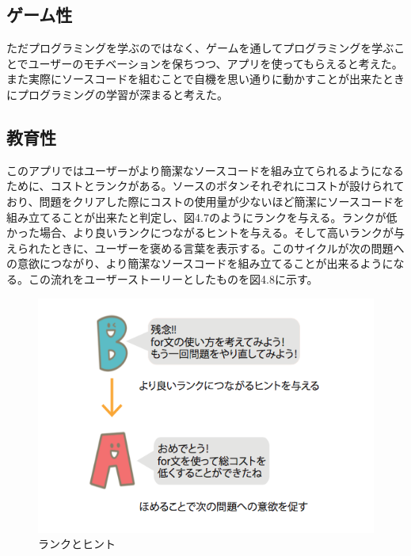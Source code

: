 \documentclass[openany,11pt,papersize]{jsbook}
\begin{document}

\subsection{ゲーム性}
ただプログラミングを学ぶのではなく、ゲームを通してプログラミングを学ぶことでユーザーのモチベーションを保ちつつ、アプリを使ってもらえると考えた。また実際にソースコードを組むことで自機を思い通りに動かすことが出来たときにプログラミングの学習が深まると考えた。
 


\subsection{教育性}
このアプリではユーザーがより簡潔なソースコードを組み立てられるようになるために、コストとランクがある。ソースのボタンそれぞれにコストが設けられており、問題をクリアした際にコストの使用量が少ないほど簡潔にソースコードを組み立てることが出来たと判定し、図4.7のようにランクを与える。ランクが低かった場合、より良いランクにつながるヒントを与える。そして高いランクが与えられたときに、ユーザーを褒める言葉を表示する。このサイクルが次の問題への意欲につながり、より簡潔なソースコードを組み立てることが出来るようになる。この流れをユーザーストーリーとしたものを図4.8に示す。

\begin{figure}[H]
\begin{center}
\includegraphics[width=12cm, bb=0 0 538 376]{img/4thParagraph/cost.png}
\end{center}
\caption{ランクとヒント}
\end{figure}
\end{document}
